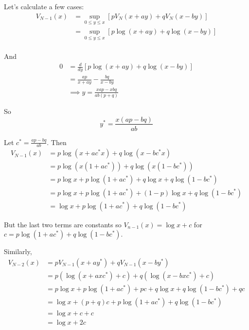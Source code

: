 \documentclass[12pt]{article}
\begin{document}
        Let's calculate a few cases:
        \begin{align*}
            V_{N-1}(x) &= \sup_{0 \leq y \leq x} [pV_N(x + ay) + qV_N(x - by)]\\ 
                &= \sup_{0 \leq y \leq x} [p\log(x + ay) + q\log(x - by)]\\ 
        \end{align*}

        And 
        \begin{align*}
            0 &= \frac{d}{dy}\left[ p\log(x + ay) + q\log(x - by)\right]\\ 
                &= \frac{ap}{x + ay} - \frac{bq}{x - by}\\
                &\implies y = \frac{xap - xbq}{ab(p+q)}
        \end{align*}

        So 
        \[y^* = \frac{x(ap - bq)}{ab}\]

        Let $c^* = \frac{ap - bq}{ab}$. Then
        \begin{align*}
            V_{N-1}(x) &= p\log(x + ac^*x) + q\log(x - bc^*x)\\ 
                &= p\log(x(1 + ac^*)) + q\log(x(1 - bc^*))\\ 
                &= p\log x + p\log(1 + ac^*) + q\log x + q\log(1 - bc^*)\\ 
                &= p\log x + p\log(1 + ac^*) + (1 - p)\log x + q\log(1 - bc^*)\\
                &= \log x + p\log(1 + ac^*) + q\log(1 - bc^*)
        \end{align*}

        But the last two terms are constants so $V_{n-1}(x) = \log x + c$ for $c = p\log(1 + ac^*) + q\log(1 - bc^*)$.

        Similarly, 
        \begin{align*}
            V_{N-2}(x) &= pV_{N-1}(x + ay^*) + qV_{N-1}(x - by^*)\\ 
                &= p(\log(x + axc^*) + c) + q(\log(x - bxc^*) + c)\\
                &= p\log x + p\log(1 + ac^*) + pc + q\log x + q\log(1 - bc^*) + qc\\
                &= \log x + (p + q)c + p\log(1 + ac^*) + q\log(1 - bc^*)\\ 
                &= \log x + c + c\\ 
                &= \log x + 2c
        \end{align*}
\end{document}
